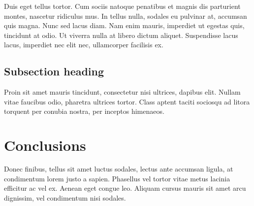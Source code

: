 \documentclass[12pt, twocolumn]{revtex4}    %
\begin{document}
Duis eget tellus tortor. Cum sociis natoque penatibus et magnis dis parturient montes, nascetur ridiculus mus. In tellus nulla, sodales eu pulvinar at, accumsan quis magna. Nunc sed lacus diam. Nam enim mauris, imperdiet ut egestas quis, tincidunt at odio. Ut viverra nulla at libero dictum aliquet. Suspendisse lacus lacus, imperdiet nec elit nec, ullamcorper facilisis ex. \cite{Ikea} \cite{EAGLE}

\subsection{Subsection heading}

Proin sit amet mauris tincidunt, consectetur nisi ultrices, dapibus elit. Nullam vitae faucibus odio, pharetra ultrices tortor. Class aptent taciti sociosqu ad litora torquent per conubia nostra, per inceptos himenaeos. 

\section{Conclusions}
Donec finibus, tellus sit amet luctus sodales, lectus ante accumsan ligula, at condimentum lorem justo a sapien. Phasellus vel tortor vitae metus lacinia efficitur ac vel ex. Aenean eget congue leo. Aliquam cursus mauris sit amet arcu dignissim, vel condimentum nisi sodales. 



\end{document}

